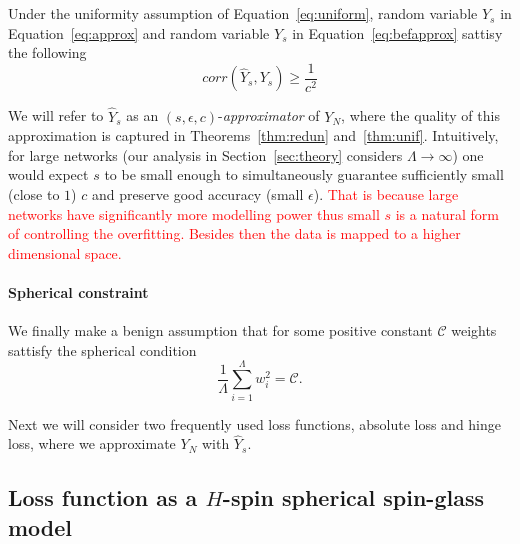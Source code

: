 \documentclass[twoside]{article}
\begin{document}
\begin{theorem}
Under the uniformity assumption of Equation~\ref{eq:uniform}, random variable $\hat{Y}_s$ in Equation~\ref{eq:approx} and random variable $Y_s$ in Equation~\ref{eq:befapprox} sattisy the following
\[corr(\hat{Y}_s,Y_s) \geq \frac{1}{c^2}
\]
\label{thm:unif}
\end{theorem}
We will refer to $\hat{Y}_s$ as an $(s,\epsilon,c)$-\textit{approximator} of $Y_N$, where the quality of this approximation is captured in Theorems~\ref{thm:redun} and~\ref{thm:unif}. Intuitively, for large networks (our analysis in Section~\ref{sec:theory} considers $\Lambda \rightarrow \infty$) one would expect $s$ to be small enough to simultaneously guarantee sufficiently small (close to $1$) $c$ and preserve good accuracy (small $\epsilon$). \textcolor{red}{That is because large networks have significantly more modelling power thus small $s$ is a natural form of controlling the overfitting. Besides then the data is mapped to a higher dimensional space.} 

\paragraph{Spherical constraint}
We finally make a benign assumption that for some positive constant $\mathcal{C}$ weights sattisfy the spherical condition 
\begin{equation}
\frac{1}{\Lambda}\sum_{i=1}^{\Lambda}w_i^2 = \mathcal{C}.
\label{eq:befspherical}
\end{equation}

Next we will consider two frequently used loss functions, absolute loss and hinge loss, where we approximate $Y_N$ with $\hat{Y}_s$. 

\subsection{Loss function as a $H$-spin spherical spin-glass model}
\label{subsec:LFSG}
\end{document}
